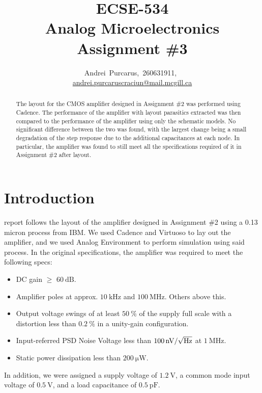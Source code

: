 \documentclass[journal,hidelinks]{IEEEtran}
\title{ECSE-534 \\ Analog Microelectronics \\ Assignment \#3}
\author{Andrei~Purcarus,~260631911,~\IEEEmembership{McGill~University} \\ \href{mailto:andrei.purcaruscraciun@mail.mcgill.ca}{andrei.purcaruscraciun@mail.mcgill.ca}}
\begin{document}
\sloppy

\maketitle

\begin{abstract}

The layout for the CMOS amplifier designed in Assignment \#2 was performed using Cadence. The performance of the amplifier with layout parasitics extracted was then compared to the performance of the amplifier using only the schematic models. No significant difference between the two was found, with the largest change being a small degradation of the step response due to the additional capacitances at each node. In particular, the amplifier was found to still meet all the specifications required of it in Assignment \#2 after layout.

\end{abstract}

\section{Introduction}

 report follows the layout of the amplifier designed in Assignment \#2 using a 0.13 micron process from IBM. We used Cadence and Virtuoso to lay out the amplifier, and we used Analog Environment to perform simulation using said process. In the original specifications, the amplifier was required to meet the following specs:
\begin{itemize}
\item DC gain $\ge$ $\SI{60}{\deci\bel}$.
\item Amplifier poles at approx. $\SI{10}{\kilo\hertz}$ and $\SI{100}{\mega\hertz}$. Others above this.
\item Output voltage swings of at least $\SI{50}{\percent}$ of the supply full scale with a distortion less than $\SI{0.2}{\percent}$ in a unity-gain configuration.
\item Input-referred PSD Noise Voltage less than $\SI{100}{\nano\volt\per\sqrt{\hertz}}$ at $\SI{1}{\mega\hertz}$.
\item Static power dissipation less than $\SI{200}{\micro\watt}$.
\end{itemize}

In addition, we were assigned a supply voltage of $\SI{1.2}{\volt}$, a common mode input voltage of $\SI{0.5}{\volt}$, and a load capacitance of $\SI{0.5}{\pico\farad}$.
\end{document}
